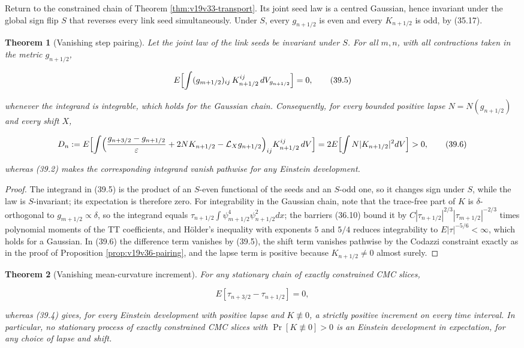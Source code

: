 \documentclass[11pt]{article}
\newtheorem{theorem}{Theorem}[section]
\theoremstyle{remark}
\begin{document}
Return to the constrained chain of Theorem \ref{thm:v19v33-transport}.
Its joint seed law is a centred Gaussian, hence invariant under the
global sign flip \(S\) that reverses every link seed simultaneously.
Under \(S\), every \(g_{n+1/2}\) is even and every \(K_{n+1/2}\) is odd,
by (35.17).

\begin{theorem}[Vanishing step pairing]
\label{thm:v19v36-step}
Let the joint law of the link seeds be invariant under \(S\).  For all
\(m,n\), with all contractions taken in the metric \(g_{n+1/2}\),

\[
 E\Bigl[\int(g_{m+1/2})_{ij}\,K_{n+1/2}^{ij}\,dV_{g_{n+1/2}}\Bigr]=0,
                                                                    \tag{39.5}
\]

whenever the integrand is integrable, which holds for the Gaussian
chain.  Consequently, for every bounded positive lapse
\(N=N(g_{n+1/2})\) and every shift \(X\),

\[
 D_n:=E\Bigl[\int\Bigl(\frac{g_{n+3/2}-g_{n+1/2}}{\varepsilon}
 +2NK_{n+1/2}-{\cal L}_Xg_{n+1/2}\Bigr)_{ij}K^{ij}_{n+1/2}\,dV\Bigr]
 =2E\Bigl[\int N|K_{n+1/2}|^2dV\Bigr]>0,                          \tag{39.6}
\]

whereas (39.2) makes the corresponding integrand vanish pathwise for
any Einstein development.
\end{theorem}

\begin{proof}
The integrand in (39.5) is the product of an \(S\)-even functional of
the seeds and an \(S\)-odd one, so it changes sign under \(S\), while
the law is \(S\)-invariant; its expectation is therefore zero.  For
integrability in the Gaussian chain, note that the trace-free part of
\(K\) is \(\delta\)-orthogonal to \(g_{m+1/2}\propto\delta\), so the
integrand equals \(\tau_{n+1/2}\int\psi_{m+1/2}^4\psi_{n+1/2}^{2}dx\);
the barriers (36.10) bound it by
\(C|\tau_{n+1/2}|^{2/3}|\tau_{m+1/2}|^{-2/3}\) times polynomial moments of
the TT coefficients, and H\"older's inequality with exponents \(5\) and
\(5/4\) reduces integrability to \(E|\tau|^{-5/6}<\infty\), which holds
for a Gaussian.  In (39.6) the difference term vanishes by (39.5), the
shift term vanishes pathwise by the Codazzi constraint exactly as in the
proof of Proposition \ref{prop:v19v36-pairing}, and the lapse term is
positive because \(K_{n+1/2}\neq0\) almost surely.
\end{proof}

\begin{theorem}[Vanishing mean-curvature increment]
\label{thm:v19v36-tau}
For any stationary chain of exactly constrained CMC slices,

\[
 E[\tau_{n+3/2}-\tau_{n+1/2}]=0,                                   \tag{39.7}
\]

whereas (39.4) gives, for every Einstein development with positive
lapse and \(K\not\equiv0\), a strictly positive increment on every time
interval.  In particular, no stationary process of exactly constrained
CMC slices with \(\Pr[K\not\equiv0]>0\) is an Einstein development in
expectation, for any choice of lapse and shift.
\end{theorem}
\end{document}
